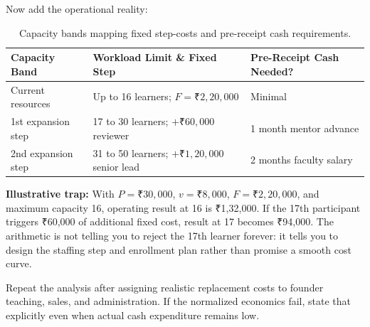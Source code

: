 Now add the operational reality:

\begin{table}[htbp]
\centering
\small
\begin{tabularx}{\columnwidth}{p{2.2cm}Xp{2.0cm}}
\toprule
\textbf{Capacity Band} & \textbf{Workload Limit \& Fixed Step} & \textbf{Pre-Receipt Cash Needed?} \\
\midrule
Current resources & Up to 16 learners; $F = ₹2,20,000$ & Minimal \\
1st expansion step & 17 to 30 learners; $+₹60,000$ reviewer & 1 month mentor advance \\
2nd expansion step & 31 to 50 learners; $+₹1,20,000$ senior lead & 2 months faculty salary \\
\bottomrule
\end{tabularx}
\caption{Capacity bands mapping fixed step-costs and pre-receipt cash requirements.}
\end{table}

\textbf{Illustrative trap:} With $P = ₹30,000$, $v = ₹8,000$, $F = ₹2,20,000$, and maximum capacity 16, operating result at 16 is ₹1,32,000. If the 17th participant triggers ₹60,000 of additional fixed cost, result at 17 becomes ₹94,000. The arithmetic is not telling you to reject the 17th learner forever: it tells you to design the staffing step and enrollment plan rather than promise a smooth cost curve.

Repeat the analysis after assigning realistic replacement costs to founder teaching, sales, and administration. If the normalized economics fail, state that explicitly even when actual cash expenditure remains low.
